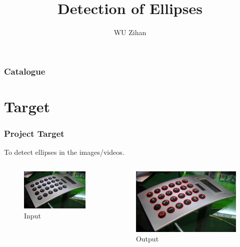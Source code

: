 \documentclass{beamer}
\title{Detection of Ellipses}
\author{WU Zihan}
\begin{document}
    \maketitle
    \begin{frame}
        \frametitle{Catalogue}
        \tableofcontents
    \end{frame}
    \section{Target}
    \begin{frame}
        \frametitle{Project Target}
    
        To detect ellipses in the images/videos.
        \begin{columns}
            \begin{column}{.5\linewidth}
                \begin{figure}
                    \includegraphics[width=0.8\linewidth]{pic/source.jpg}
                    \caption{Input}
                \end{figure}
            \end{column}
            \begin{column}{.5\linewidth}
                \begin{figure}
                    \includegraphics[width=0.8\linewidth]{pic/ideaoutput.jpg}
                    \caption{Output}
                \end{figure}
            \end{column}
        \end{columns}
    
    \end{frame}
\end{document}
